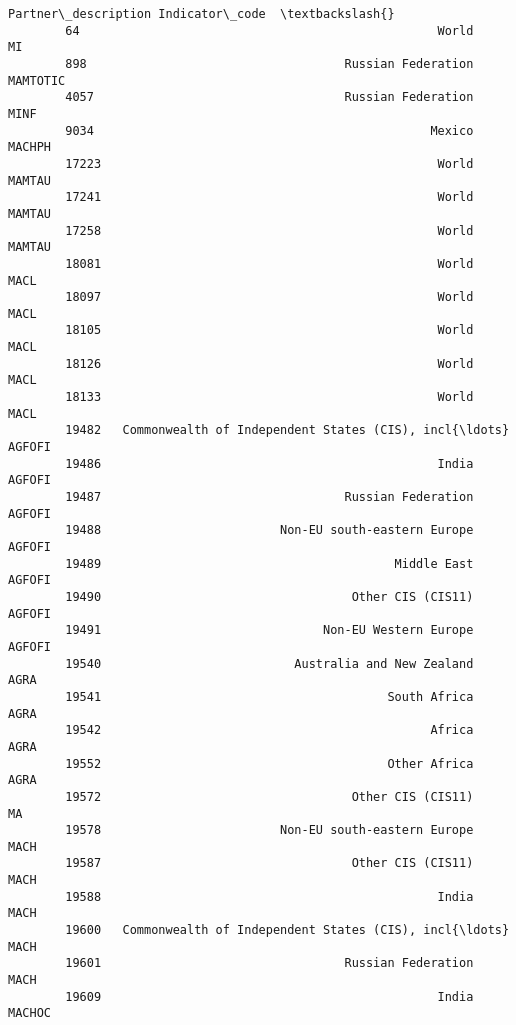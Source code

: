 \documentclass[11pt]{article}
\begin{document}
\begin{Verbatim}[commandchars=\\\{\}]
                                              Partner\_description Indicator\_code  \textbackslash{}
        64                                                  World       MI         
        898                                    Russian Federation       MAMTOTIC   
        4057                                   Russian Federation       MINF       
        9034                                               Mexico       MACHPH     
        17223                                               World       MAMTAU     
        17241                                               World       MAMTAU     
        17258                                               World       MAMTAU     
        18081                                               World       MACL       
        18097                                               World       MACL       
        18105                                               World       MACL       
        18126                                               World       MACL       
        18133                                               World       MACL       
        19482   Commonwealth of Independent States (CIS), incl{\ldots}       AGFOFI     
        19486                                               India       AGFOFI     
        19487                                  Russian Federation       AGFOFI     
        19488                         Non-EU south-eastern Europe       AGFOFI     
        19489                                         Middle East       AGFOFI     
        19490                                   Other CIS (CIS11)       AGFOFI     
        19491                               Non-EU Western Europe       AGFOFI     
        19540                           Australia and New Zealand       AGRA       
        19541                                        South Africa       AGRA       
        19542                                              Africa       AGRA       
        19552                                        Other Africa       AGRA       
        19572                                   Other CIS (CIS11)       MA         
        19578                         Non-EU south-eastern Europe       MACH       
        19587                                   Other CIS (CIS11)       MACH       
        19588                                               India       MACH       
        19600   Commonwealth of Independent States (CIS), incl{\ldots}       MACH       
        19601                                  Russian Federation       MACH       
        19609                                               India       MACHOC     

\end{Verbatim}
\end{document}
